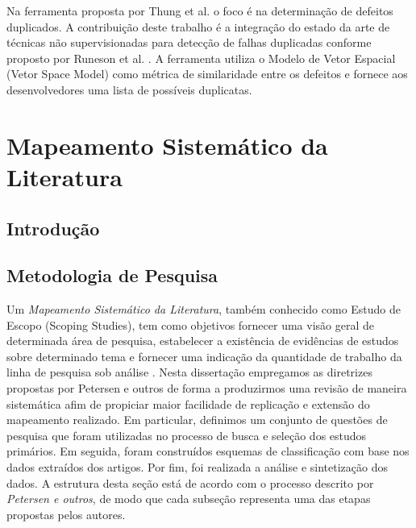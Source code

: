 \documentclass[msc]{ppgccufmg} %
\begin{document}
Na ferramenta proposta por Thung et al. \cite{Thung:2014:DIT:2642937.2648627} o
foco é na determinação de defeitos duplicados. A contribuição deste trabalho é a
integração do estado da arte de técnicas não supervisionadas para detecção de
falhas duplicadas conforme proposto por Runeson et al. \cite{Runeson:2007:DDD:1248820.1248882}. A ferramenta utiliza o Modelo de Vetor Espacial (Vetor Space Model) como métrica de similaridade entre os defeitos e fornece aos desenvolvedores uma lista de possíveis duplicatas.

\chapter{Mapeamento Sistemático da Literatura}
\label{ch:mapeamento-sistematico}





\section{Introdução}
\label{sec:map-intro}

\section{Metodologia de Pesquisa}
\label{sec:map-metodologia}

Um \textit{Mapeamento Sistemático da Literatura}, também conhecido como Estudo de Escopo (Scoping Studies), tem como objetivos fornecer uma visão geral de determinada área de pesquisa, estabelecer a existência de evidências de estudos sobre determinado tema e fornecer uma indicação da quantidade de trabalho da linha de pesquisa sob análise \cite{keele2007guidelines,wohlin2012experimentation}. Nesta dissertação empregamos as diretrizes propostas por Petersen e outros \cite{Petersen2008} de forma a produzirmos uma revisão de maneira sistemática afim de propiciar maior facilidade de replicação e extensão do mapeamento realizado. Em particular, definimos um conjunto de questões de pesquisa que foram utilizadas no processo de busca e seleção dos estudos primários. Em seguida, foram construídos esquemas de classificação com base nos dados extraídos  dos artigos. Por fim, foi realizada a análise e sintetização dos dados. A estrutura desta seção está de acordo com o processo descrito por \textit{Petersen e outros}, de modo que cada subseção representa uma das etapas propostas pelos autores.
\end{document}
